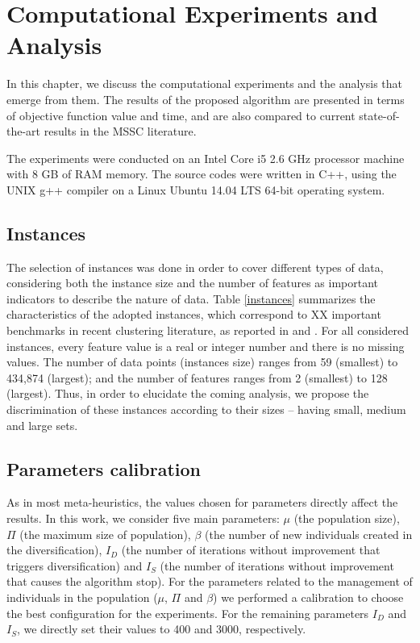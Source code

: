 \chapter{Computational Experiments and Analysis}
In this chapter, we discuss the computational experiments and the analysis that emerge from them. The results of the proposed algorithm are presented in terms of objective function value and time, and are also compared to current state-of-the-art results in the MSSC literature.

The experiments were conducted on an Intel Core i5 2.6 GHz processor machine with 8 GB of RAM memory. The source codes were written in C++, using the UNIX g++ compiler on a Linux Ubuntu 14.04 LTS 64-bit operating system.

\section{Instances}
The selection of instances was done in order to cover different types of data, considering both the instance size and the number of features as important indicators to describe the nature of data. Table \ref{instances} summarizes the characteristics of the adopted instances, which correspond to XX important benchmarks in recent clustering literature, as reported in \cite{Ordin2014} and \cite{Bagirov2016}. For all considered instances, every feature value is a real or integer number and there is no missing values. The number of data points (instances size) ranges from 59 (smallest) to 434,874 (largest); and the number of features ranges from 2 (smallest) to 128 (largest). Thus, in order to elucidate the coming analysis, we propose the discrimination of these instances according to their sizes -- having small, medium and large sets. %



\section{Parameters calibration}
As in most meta-heuristics, the values chosen for parameters directly affect the results. In this work, we consider five main parameters: $\mu$ (the population size), $\Pi$ (the maximum size of population), $\beta$ (the number of new individuals created in the diversification), $I_D$ (the number of iterations without improvement that triggers diversification) and $I_S$ (the number of iterations without improvement that causes the algorithm stop). For the parameters related to the management of individuals in the population ($\mu$, $\Pi$ and $\beta$) we performed a calibration to choose the best configuration for the experiments. For the remaining parameters $I_D$ and $I_S$, we directly set their values to 400 and 3000, respectively.

